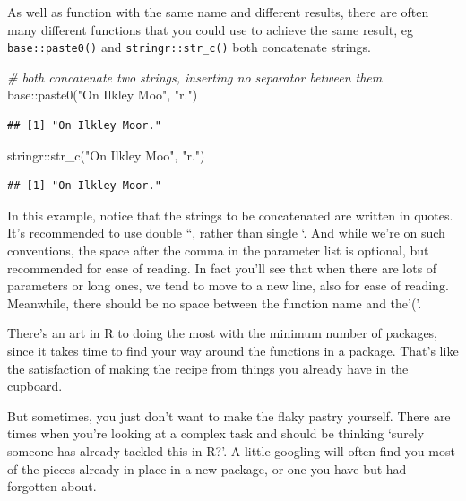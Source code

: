 \documentclass[
]{book}
\newenvironment{Shaded}{\begin{snugshade}}{\end{snugshade}}
\newcommand{\CommentTok}[1]{\textcolor[rgb]{0.56,0.35,0.01}{\textit{#1}}}
\newcommand{\FunctionTok}[1]{\textcolor[rgb]{0.00,0.00,0.00}{#1}}
\newcommand{\NormalTok}[1]{#1}
\newcommand{\SpecialCharTok}[1]{\textcolor[rgb]{0.00,0.00,0.00}{#1}}
\newcommand{\StringTok}[1]{\textcolor[rgb]{0.31,0.60,0.02}{#1}}
\begin{document}
As well as function with the same name and different results, there are often many different functions that you could use to achieve the same result, eg \texttt{base::paste0()} and \texttt{stringr::str\_c()} both concatenate strings.

\begin{Shaded}
\begin{Highlighting}[]
\CommentTok{\# both concatenate two strings, inserting no separator between them}
\NormalTok{base}\SpecialCharTok{::}\FunctionTok{paste0}\NormalTok{(}\StringTok{"On Ilkley Moo"}\NormalTok{, }\StringTok{"r."}\NormalTok{)}
\end{Highlighting}
\end{Shaded}

\begin{verbatim}
## [1] "On Ilkley Moor."
\end{verbatim}

\begin{Shaded}
\begin{Highlighting}[]
\NormalTok{stringr}\SpecialCharTok{::}\FunctionTok{str\_c}\NormalTok{(}\StringTok{"On Ilkley Moo"}\NormalTok{, }\StringTok{"r."}\NormalTok{)}
\end{Highlighting}
\end{Shaded}

\begin{verbatim}
## [1] "On Ilkley Moor."
\end{verbatim}

In this example, notice that the strings to be concatenated are written in quotes. It's recommended to use double ``, rather than single `. And while we're on such conventions, the space after the comma in the parameter list is optional, but recommended for ease of reading. In fact you'll see that when there are lots of parameters or long ones, we tend to move to a new line, also for ease of reading. Meanwhile, there should be no space between the function name and the'('.

There's an art in R to doing the most with the minimum number of packages, since it takes time to find your way around the functions in a package. That's like the satisfaction of making the recipe from things you already have in the cupboard.

But sometimes, you just don't want to make the flaky pastry yourself. There are times when you're looking at a complex task and should be thinking `surely someone has already tackled this in R?'. A little googling will often find you most of the pieces already in place in a new package, or one you have but had forgotten about.
\end{document}
